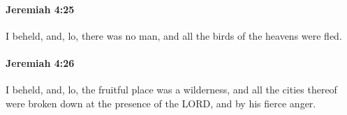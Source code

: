 		\paragraph{Jeremiah 4:25} %
			\label{JEREMIAH-4-25}

			I beheld, and, lo, there was no man, and all the birds of the heavens were fled.


		\paragraph{Jeremiah 4:26} %
			\label{JEREMIAH-4-26}

			I beheld, and, lo, the fruitful place was a wilderness, and all the cities thereof were broken down at the presence of the LORD, and by his fierce anger.


